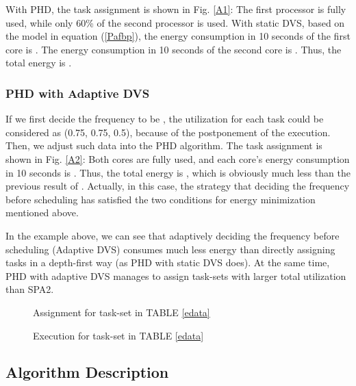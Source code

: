 \documentclass[12pt, journal,compsoc]{IEEEtran}
\begin{document}
With PHD, the task assignment is shown in Fig. \ref{A1}: The first processor is fully used, while only 60\% of the second processor is used. With static DVS, based on the model in equation (\ref{Pafbp}), the energy consumption in 10 seconds of the first core is . The energy consumption in 10 seconds of the second core is . Thus, the total energy is .

\subsubsection{PHD with Adaptive DVS}

If we first decide the frequency  to be , the utilization for each task could be considered as (0.75, 0.75, 0.5), because of the postponement of the execution. Then, we adjust such data into the PHD algorithm. The task assignment is shown in Fig. \ref{A2}: Both cores are fully used, and each core's energy consumption in 10 seconds is . Thus, the total energy is , which is obviously much less than the previous result of . Actually, in this case, the strategy that deciding the frequency before scheduling has satisfied the two conditions for energy minimization mentioned above.


\vspace{0.1in}

In the example above, we can see that adaptively deciding the frequency before scheduling (Adaptive DVS) consumes much less energy than directly assigning tasks in a depth-first way (as PHD with static DVS does). At the same time, PHD with adaptive DVS manages to assign task-sets with larger total utilization than SPA2.

\begin{figure}[!t]
\centering
{}
\hspace{-0.1in}
\caption{Assignment for task-set in TABLE \ref{edata}}
\end{figure}


\begin{figure}[!t]
\centering
{}
\caption{Execution for task-set in TABLE \ref{edata}}
\end{figure}

\subsection{Algorithm Description}
\end{document}
